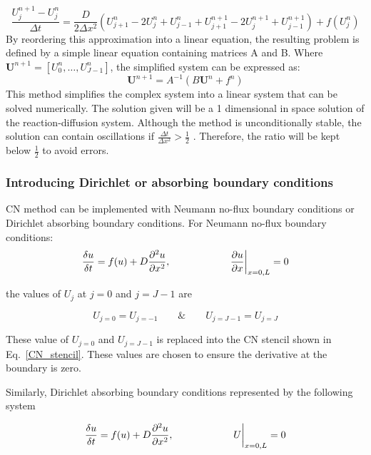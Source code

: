 \begin{equation}
    \frac{U^{n+1}_{j} - U^{n}_{j}}{\Delta t} = \frac{D}{2\Delta x^{2}}\left( U^{n}_{j+1} -  2U^{n}_{j} + U^{n}_{j-1} + U^{n+1}_{j+1} - 2U^{n+1}_{j} + U^{n+1}_{j-1}\right) +  f( U^{n}_{j})
    \label{CN_stencil}
\end{equation}
By reordering this approximation into a linear equation, the resulting problem is defined by a simple linear equation containing matrices A and B. Where $\textbf{U}^{n+1} = [U^{n}_{0}, \ldots , U^{n}_{J-1}]$, the simplified system can be expressed as:
\begin{equation}
    \textbf{U}^{n+1} = A^{-1}(B\textbf{U}^{n} + f^{n})
\end{equation}
This method simplifies the complex system into a linear system that can be solved numerically. The solution given will be a 1 dimensional in space solution of the reaction-diffusion system. Although the method is  unconditionally stable, the solution can contain oscillations if $ \frac{\Delta t}{\Delta x^{2}} >\frac{1}{2} $ \parencite{trefethen1996finite}. Therefore, the ratio will be kept below $\frac{1}{2}$ to avoid errors.

\subsubsection{Introducing Dirichlet or absorbing boundary conditions}\label{methods_boundary_conditions_CN}
CN method can be implemented with Neumann no-flux boundary conditions or Dirichlet absorbing boundary conditions.
For Neumann no-flux boundary conditions:
\begin{equation}
    \frac{\delta u}{\delta t} =  f(u) + D\frac{\partial^{2} {u}}{\partial {x}^{2}},   \quad \quad \quad \quad \quad \quad \pdv{u}{x}\biggr\rvert_{x=0,L}=0
\end{equation}

the values of $U_{j}$ at $j=0$ and $j=J-1$ are

\begin{equation}
    U_{j=0} = U_{j=-1}  \quad \quad \&  \quad \quad  U_{j=J-1} = U_{j=J}
\end{equation}

These value of $U_{j=0}$ and  $U_{j=J-1}$ is replaced into the CN stencil shown in Eq.~\ref{CN_stencil}.
These values are chosen to ensure the derivative at the boundary is zero.

Similarly, Dirichlet absorbing boundary conditions represented by the following system

\begin{equation}
    \frac{\delta u}{\delta t} =  f(u) + D\frac{\partial^{2} {u}}{\partial {x}^{2}},   \quad \quad \quad \quad \quad \quad U\biggr\rvert_{x=0,L}=0
\end{equation}

